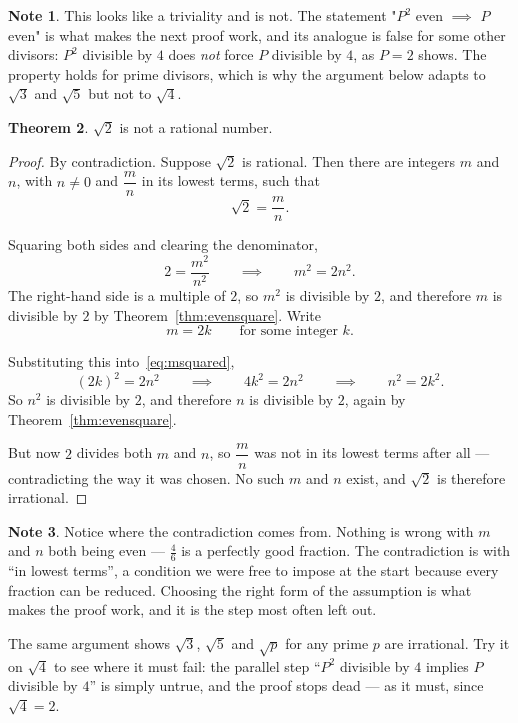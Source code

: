 \documentclass[11pt,a4paper]{article}
\theoremstyle{definition}
\newtheorem{thm}{Theorem}[section]
\newtheorem{note}[thm]{Note}
\begin{document}
\begin{note}
This looks like a triviality and is not. The statement "$P^{2}$ even $\implies$ $P$
even" is what makes the next proof work, and its analogue is false for some other
divisors: $P^{2}$ divisible by $4$ does \emph{not} force $P$ divisible by $4$, as
$P=2$ shows. The property holds for prime divisors, which is why the argument
below adapts to $\sqrt{3}$ and $\sqrt{5}$ but not to $\sqrt{4}$.
\end{note}

\begin{thm}
$\sqrt{2}$ is not a rational number.
\end{thm}
\begin{proof}
By contradiction. Suppose $\sqrt{2}$ is rational. Then there are integers $m$
and $n$, with $n\neq0$ and $\dfrac{m}{n}$ in its lowest terms, such that
$$\sqrt{2}=\frac{m}{n}.$$

Squaring both sides and clearing the denominator,
\begin{equation}\label{eq:msquared}
2=\frac{m^{2}}{n^{2}}\qquad\implies\qquad m^{2}=2n^{2}.
\end{equation}
The right-hand side is a multiple of $2$, so $m^{2}$ is divisible by $2$, and
therefore $m$ is divisible by $2$ by Theorem~\ref{thm:evensquare}. Write
$$m=2k \qquad\text{for some integer } k.$$

Substituting this into~\eqref{eq:msquared},
$$\left(2k\right)^{2}=2n^{2}\qquad\implies\qquad 4k^{2}=2n^{2}
\qquad\implies\qquad n^{2}=2k^{2}.$$
So $n^{2}$ is divisible by $2$, and therefore $n$ is divisible by $2$, again by
Theorem~\ref{thm:evensquare}.

But now $2$ divides both $m$ and $n$, so $\dfrac{m}{n}$ was not in its lowest
terms after all --- contradicting the way it was chosen. No such $m$ and $n$
exist, and $\sqrt{2}$ is therefore irrational.
\end{proof}

\begin{note}
Notice where the contradiction comes from. Nothing is wrong with $m$ and $n$ both
being even --- $\frac{4}{6}$ is a perfectly good fraction. The contradiction is with
``in lowest terms'', a condition we were free to impose at the start because every
fraction can be reduced. Choosing the right form of the assumption is what makes
the proof work, and it is the step most often left out.

The same argument shows $\sqrt{3}$, $\sqrt{5}$ and $\sqrt{p}$ for any prime $p$ are
irrational. Try it on $\sqrt{4}$ to see where it must fail: the parallel step
``$P^{2}$ divisible by $4$ implies $P$ divisible by $4$'' is simply untrue, and the
proof stops dead --- as it must, since $\sqrt{4}=2$.
\end{note}
\end{document}
